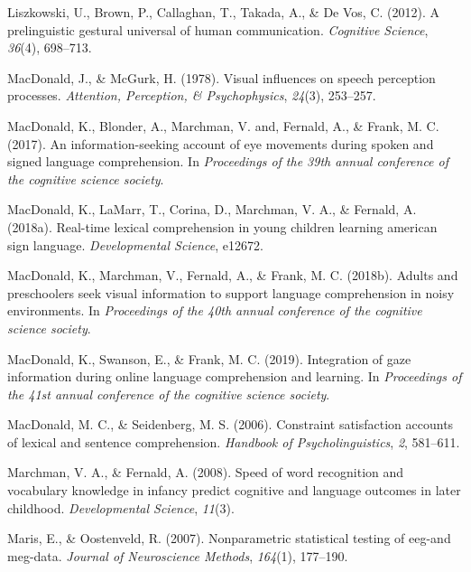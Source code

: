\documentclass[,man,floatsintext]{apa6}
\begin{document}
\leavevmode\hypertarget{ref-liszkowski2012prelinguistic}{}%
Liszkowski, U., Brown, P., Callaghan, T., Takada, A., \& De Vos, C. (2012). A prelinguistic gestural universal of human communication. \emph{Cognitive Science}, \emph{36}(4), 698--713.

\leavevmode\hypertarget{ref-macdonald1978visual}{}%
MacDonald, J., \& McGurk, H. (1978). Visual influences on speech perception processes. \emph{Attention, Perception, \& Psychophysics}, \emph{24}(3), 253--257.

\leavevmode\hypertarget{ref-macdonald2017info}{}%
MacDonald, K., Blonder, A., Marchman, V. and, Fernald, A., \& Frank, M. C. (2017). An information-seeking account of eye movements during spoken and signed language comprehension. In \emph{Proceedings of the 39th annual conference of the cognitive science society}.

\leavevmode\hypertarget{ref-macdonald2018real}{}%
MacDonald, K., LaMarr, T., Corina, D., Marchman, V. A., \& Fernald, A. (2018a). Real-time lexical comprehension in young children learning american sign language. \emph{Developmental Science}, e12672.

\leavevmode\hypertarget{ref-macdonald2018noise}{}%
MacDonald, K., Marchman, V., Fernald, A., \& Frank, M. C. (2018b). Adults and preschoolers seek visual information to support language comprehension in noisy environments. In \emph{Proceedings of the 40th annual conference of the cognitive science society}.

\leavevmode\hypertarget{ref-macdonald2019integration}{}%
MacDonald, K., Swanson, E., \& Frank, M. C. (2019). Integration of gaze information during online language comprehension and learning. In \emph{Proceedings of the 41st annual conference of the cognitive science society}.

\leavevmode\hypertarget{ref-macdonald2006constraint}{}%
MacDonald, M. C., \& Seidenberg, M. S. (2006). Constraint satisfaction accounts of lexical and sentence comprehension. \emph{Handbook of Psycholinguistics}, \emph{2}, 581--611.

\leavevmode\hypertarget{ref-marchman2008speed}{}%
Marchman, V. A., \& Fernald, A. (2008). Speed of word recognition and vocabulary knowledge in infancy predict cognitive and language outcomes in later childhood. \emph{Developmental Science}, \emph{11}(3).

\leavevmode\hypertarget{ref-maris2007nonparametric}{}%
Maris, E., \& Oostenveld, R. (2007). Nonparametric statistical testing of eeg-and meg-data. \emph{Journal of Neuroscience Methods}, \emph{164}(1), 177--190.
\end{document}
